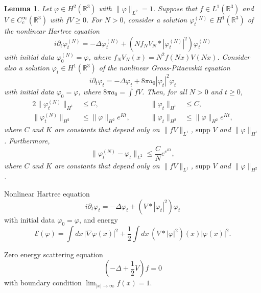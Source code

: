 \documentclass[11pt,a4paper]{scrartcl} %
\newtheorem{lem}[thm]{Lemma}
\newcommand{\R}{\mathds{R}}
\begin{document}
\begin{lem}
  Let $\varphi \in H^2(\R^3)$ with $\| \varphi \|_{L^2} = 1$. Suppose that $f
  \in L^1(\R^3)$ and $V \in C_c^\infty(\R^3)$ with $fV \ge 0$. For $N > 0$,
  consider a solution $\varphi_t^{(N)} \in H^1(\R^3)$ of the nonlinear Hartree
  equation
  \begin{displaymath}
    i \partial_t \varphi_t^{(N)} = - \Delta \varphi_t^{(N)} + (N f_N V_N *
    |\varphi_t^{(N)}|^2) \varphi_t^{(N)}
  \end{displaymath}
  with initial data $\varphi^{(N)}_0 = \varphi$, where $f_N V_N(x) = N^2
  f(Nx)V(Nx)$. Consider also a solution $\varphi_t \in H^1(\R^3)$ of the
  nonlinear Gross-Pitaevskii equation
  \begin{displaymath}
    i \partial_t \varphi_t = - \Delta \varphi_t + 8 \pi a_0 |\varphi_t|^2
    \varphi_t
  \end{displaymath}
  with initial data $\varphi_0 = \varphi$, where $8 \pi a_0 = \int f V$. Then,
  for all $N > 0$ and $t \ge 0$,
  \begin{alignat}{2}
    \| \varphi_t^{(N)} \|_{H^1} & \le C, & \qquad \| \varphi_t \|_{H^1} &
    \le C, \tag{i} \\
    \| \varphi_t^{(N)} \|_{H^2} & \le \| \varphi \|_{H^2} e^{K t}, & \qquad
    \| \varphi_t \|_{H^2} & \le \| \varphi \|_{H^2} e^{K t}, \tag{ii}
  \end{alignat}
  where $C$ and $K$ are constants that depend only on $\| fV \|_{L^1}$,
  $\text{supp }V$ and $\| \varphi \|_{H^1}$. Furthermore,
  \begin{equation}
    \| \varphi_t^{(N)} - \varphi_t \|_{L^2} \le \frac{C}{N} e^{e^{K t}},
    \tag{iii}
  \end{equation}
  where $C$ and $K$ are constants that depend only on $\| fV \|_{L^1}$,
  $\text{supp }V$ and $\| \varphi \|_{H^2}$.
\end{lem}


Nonlinear Hartree equation
\begin{displaymath}
  i \partial_t \varphi_t = - \Delta \varphi_t + (V * |\varphi_t|^2) \varphi_t
\end{displaymath}
with initial data $\varphi_0 = \varphi$, and energy
\begin{displaymath}
  \mathcal{E}(\varphi) = \int dx \, |\nabla \varphi(x)|^2 + \frac{1}{2} \int
  dx \, (V * |\varphi|^2)(x) |\varphi(x)|^2.
\end{displaymath}


Zero energy scattering equation
\begin{displaymath}
  \left( - \Delta + \frac{1}{2} V \right)f = 0
\end{displaymath}
with boundary condition $\lim_{|x| \to \infty} f(x) = 1$.
\end{document}
